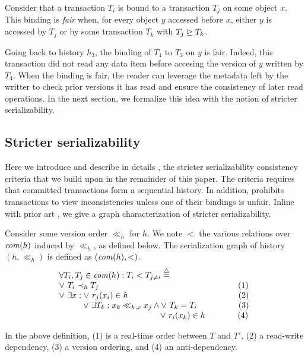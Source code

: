 \begin{definition}
  Consider that a transaction $T_i$ is bound to a transaction $T_j$ on some object $x$.
  This binding is \emph{fair} when, for every object $y$ accessed before $x$, either $y$ is accessed by $T_j$ or by some transaction $T_k$ with $T_j \mathrel{\unrhd} T_k$.
\end{definition}

Going back to history $h_3$, the binding of $T_4$ to $T_3$ on $y$ is fair.
Indeed, this transaction did not read any data item before accesing the version of $y$ written by $T_4$.
When the binding is fair, the reader can leverage the metadata left by the writter to check prior versions it has read and ensure the consistency of later read operations.
In the next section, we formalize this idea with the notion of stricter serializability.

\subsection{Stricter serializability}
Here we introduce and describe in details \SPSER, the stricter serializability consistency criteria that we build upon in the remainder of this paper.
The \sser criteria requires that committed transactions form a sequential history.
In addition, \sser prohibits transactions to view inconsistencies unless one of their bindings is unfair.
Inline with prior art \cite{berstein,opa}, we give a graph characterization of stricter serializability.

\begin{definition}
  Consider some version order $\ll_h$ for $h$.
  We note $<$ the various relations over $\committed{h}$ induced by $\ll_h$, as defined below.
  The serialization graph of history $(h,\ll_h)$ is defined as $(\committed{h},<)$.
  \begin{displaymath}
    \begin{array}{l}
      \forall T_i, T_j \in \committed{h} : 
      T_i < T_{j \neq i}  \equaldef \\
      \lor~ T_i \hb_h T_j {\hspace{16.8em}\text{(1)}} \\
      \lor~ \exists x : \lor~ r_j(x_i) \in h {\hspace{13.3em}\text{(2)}} \\
      \hspace{2.9em}\lor~ \exists T_k : x_k \ll_{h,x} x_j \land \lor~T_k = T_i {\hspace{5em}\text{(3)}} \\
      \hspace{12.2em} \lor~ r_i(x_k) \in h {\hspace{3.9em}\text{(4)}}
    \end{array}
  \end{displaymath}  
\end{definition}
In the above definition, (1) is a real-time order between $T$ and $T'$, (2) a read-write dependency, (3) a version ordering, and (4) an anti-dependency.

